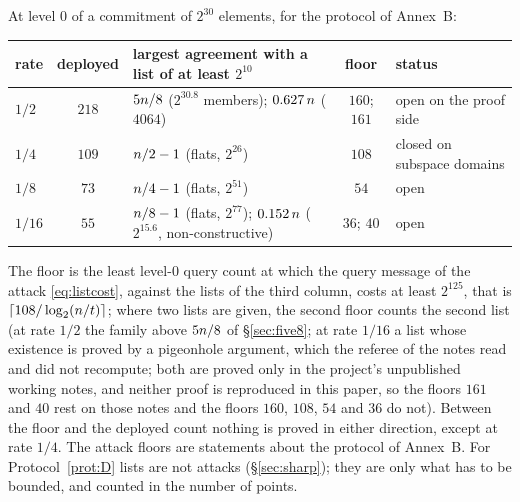 At level $0$ of a commitment of $2^{30}$ elements, for the protocol of Annex~B:
\begin{center}
\small
\begin{tabular}{@{}lcL{0.36\textwidth}cL{0.24\textwidth}@{}}
\toprule
rate & deployed & largest agreement with a list of at least $2^{10}$ & floor & status\\
\midrule
$1/2$ & $218$ & $5n/8$ ($2^{30.8}$ members); $0.627\,n$ ($4064$) & $160$; $161$ & open on the proof side\\
$1/4$ & $109$ & $n/2-1$ (flats, $2^{26}$) & $108$ & closed on subspace domains\\
$1/8$ & $73$ & $n/4-1$ (flats, $2^{51}$) & $54$ & open\\
$1/16$ & $55$ & $n/8-1$ (flats, $2^{77}$); $0.152\,n$ ($2^{15.6}$, non-constructive) & $36$; $40$ & open\\
\bottomrule
\end{tabular}
\end{center}
The floor is the least level-$0$ query count at which the query message of the attack \eqref{eq:listcost}, against the lists of the third column, costs at least $2^{125}$, that is $\lceil108/\log_2(n/t)\rceil$; where two lists are given, the second floor counts the second list (at rate $1/2$ the family above $5n/8$ of \S\ref{sec:five8}; at rate $1/16$ a list whose existence is proved by a pigeonhole argument, which the referee of the notes read and did not recompute; both are proved only in the project's unpublished working notes, and neither proof is reproduced in this paper, so the floors $161$ and $40$ rest on those notes and the floors $160$, $108$, $54$ and $36$ do not). Between the floor and the deployed count nothing is proved in either direction, except at rate $1/4$. The attack floors are statements about the protocol of Annex~B. For Protocol~\ref{prot:D} lists are not attacks (\S\ref{sec:sharp}); they are only what has to be bounded, and counted in the number of points.
